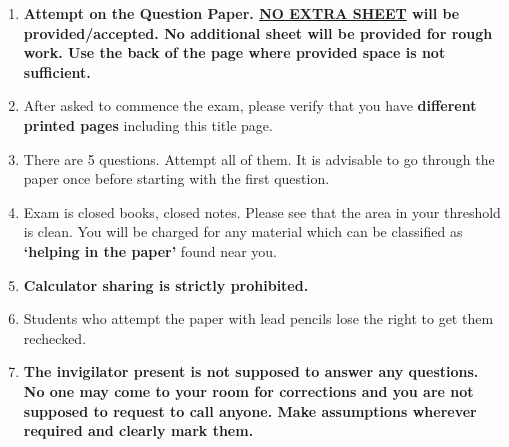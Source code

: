 \documentclass[12pt,a4paper]{article}
\begin{document}
\begin{enumerate}
\item \textbf{Attempt on the Question Paper. \underline{NO EXTRA SHEET} will be provided/accepted. No
additional sheet will be provided for rough work. Use the back of the page where
provided space is not sufficient.}
\item After asked to commence the exam, please verify that you have \textbf{\pageref{LastPage} different
printed pages} including this title page.
\item There are 5 questions. Attempt all of them. It is advisable to go through the paper once
before starting with the first question.
\item Exam is closed books, closed notes. Please see that the area in your threshold is clean.
You will be charged for any material which can be classified as \textbf{`helping in the paper'}
found near you.
\item \textbf{Calculator sharing is strictly prohibited.}
\item Students who attempt the paper with lead pencils lose the right to get them rechecked.
\item \textbf{The invigilator present is not supposed to answer any questions. No one may come
to your room for corrections and you are not supposed to request to call anyone.
Make assumptions wherever required and clearly mark them.}
\end{enumerate}
\newpage
\end{document}
